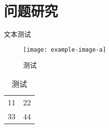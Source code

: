 
\chapter{问题研究}

文本测试

\begin{figure}[htbp]
  \centering
  \texttt{[image: example-image-a]}
  \caption{测试}
  \label{figure:test2}
\end{figure}

\begin{table}[htbp]
  \centering
  \caption{测试}
  \label{table:test2}
  \begin{tabular}{|c|c|}
    11 & 22 \\
    33 & 44 
  \end{tabular}
\end{table}